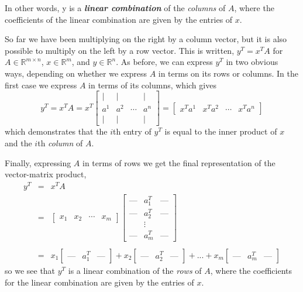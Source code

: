 \documentclass[12pt]{article}
\begin{document}
In other words, y is a \textbf{\textit{linear combination}} of the
\textit{columns} of $A$, where the coefficients of the linear
combination are given by the entries of $x$. 

So far we have been multiplying on the right by a column vector, but
it is also possible to multiply on the left by a row vector.  This is
written, $y^T = x^T A$ for $A \in \mathbb{R}^{m \times n}$, $x \in
\mathbb{R}^m$, and $y \in \mathbb{R}^n$.  As before, we can express
$y^T$ in two obvious ways, depending on whether we express $A$ in
terms on its rows or columns.  In the first case we express $A$ in
terms of its columns, which gives
\[y^T = x^T A = x^T \left [ \begin{array}{cccc} | & | &  & 
  | \\ a^1 & a^2 & \cdots & a^n \\ | & | &  & |
  \end{array} \right ] = \left [
  \begin{array}{cccc} x^T a^1 & x^T a^2 & \cdots & x^T a^n \end{array}
  \right ] \]
which demonstrates that the $i$th entry of $y^T$ is equal to the inner
product of $x$ and the $i$th \textit{column} of $A$.

Finally, expressing $A$ in terms of rows we get the final
representation of the vector-matrix product,
\begin{eqnarray*}
y^T & = & x^T A \\
    & = & \left [ \begin{array}{cccc}x_1 & x_2 & \cdots & x_m 
  \end{array} \right ] \left [ \begin{array}{ccc} \mbox{---} & a^T_1 & 
  \mbox{---} \\   \mbox{---} & a^T_2 &  \mbox{---} \\ & \vdots & \\
  \mbox{---} & a^T_m  &  \mbox{---} \end{array} \right ] \\ & & \\ 
& = & x_1 \left [ \begin{array}{ccc} \mbox{---} & a^T_1 & \mbox{---}
  \end{array} \right ] + x_2 \left [ \begin{array}{ccc} \mbox{---} &
    a^T_2 & \mbox{---} \end{array} \right ] + ... + x_m \left [
    \begin{array}{ccc} \mbox{---} & a^T_m & \mbox{---} \end{array} \right ]
\end{eqnarray*}
so we see that $y^T$ is a linear combination of the \textit{rows} of
$A$, where the coefficients for the linear combination are given by
the entries of $x$.
\end{document}
